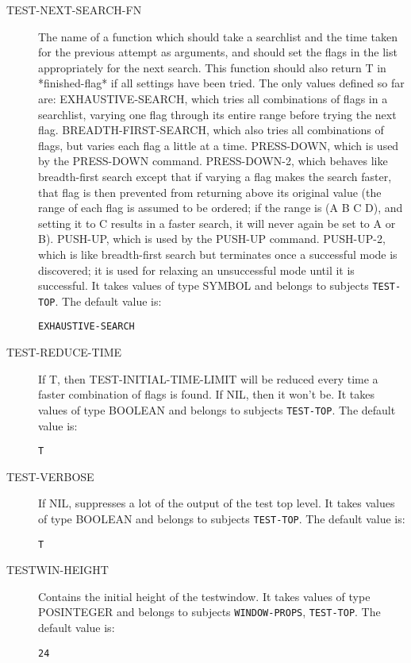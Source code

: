 \begin{description}
\item[TEST-NEXT-SEARCH-FN]  
The name of a function which should take a searchlist and the time taken for
the previous attempt as arguments, and should set the flags in the list
appropriately for the next search. This function should also return T in
*finished-flag* if all settings have been tried.
The only values defined so far are:
EXHAUSTIVE-SEARCH, which tries all combinations of flags in a searchlist, 
 varying one flag through its entire range before trying the next flag.
BREADTH-FIRST-SEARCH, which also tries all combinations of flags, but 
 varies each flag a little at a time.
PRESS-DOWN, which is used by the PRESS-DOWN command.
PRESS-DOWN-2, which behaves like breadth-first search except that if varying
 a flag makes the search faster, that flag is then prevented
 from returning above its original value (the range of each flag is 
 assumed to be ordered; if the range is (A B C D), and setting it to
 C results in a faster search, it will never again be set to A or B).
PUSH-UP, which is used by the PUSH-UP command.
PUSH-UP-2, which is like breadth-first search but terminates once a 
 successful mode is discovered; it is used for relaxing an unsuccessful
 mode until it is successful.
It takes values of type SYMBOL and belongs to subjects \texttt{TEST-TOP}.  The default value is: \begin{lstlisting}
EXHAUSTIVE-SEARCH
\end{lstlisting}

\item[TEST-REDUCE-TIME]  
If T, then TEST-INITIAL-TIME-LIMIT will be reduced every time a faster 
combination of flags is found. If NIL, then it won't be.
It takes values of type BOOLEAN and belongs to subjects \texttt{TEST-TOP}.  The default value is: \begin{lstlisting}
T
\end{lstlisting}

\item[TEST-VERBOSE]  
If NIL, suppresses a lot of the output of the test top level.
It takes values of type BOOLEAN and belongs to subjects \texttt{TEST-TOP}.  The default value is: \begin{lstlisting}
T
\end{lstlisting}

\item[TESTWIN-HEIGHT]  
Contains the initial height of the testwindow.
It takes values of type POSINTEGER and belongs to subjects \texttt{WINDOW-PROPS}, \texttt{TEST-TOP}.  The default value is: \begin{lstlisting}
24
\end{lstlisting}


\end{description}
